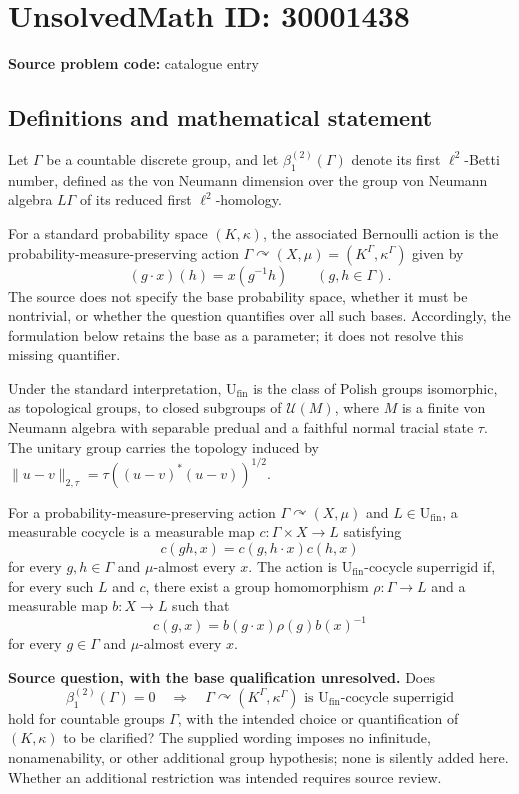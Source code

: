 \documentclass[11pt]{article}
\begin{document}
\section*{UnsolvedMath ID: 30001438}
\textbf{Source problem code:} catalogue entry
\subsection{Definitions and mathematical statement}
Let \(\Gamma\) be a countable discrete group, and let \(\beta^{(2)}_1(\Gamma)\) denote its first \(\ell^2\)-Betti number, defined as the von Neumann dimension over the group von Neumann algebra \(L\Gamma\) of its reduced first \(\ell^2\)-homology.

For a standard probability space \((K,\kappa)\), the associated Bernoulli action is the probability-measure-preserving action \(\Gamma\curvearrowright(X,\mu)=(K^\Gamma,\kappa^\Gamma)\) given by
\[
(g\cdot x)(h)=x(g^{-1}h)\qquad(g,h\in\Gamma).
\]
The source does not specify the base probability space, whether it must be nontrivial, or whether the question quantifies over all such bases. Accordingly, the formulation below retains the base as a parameter; it does not resolve this missing quantifier.

Under the standard interpretation, \(\mathrm{U}_{\mathrm{fin}}\) is the class of Polish groups isomorphic, as topological groups, to closed subgroups of \(\mathcal U(M)\), where \(M\) is a finite von Neumann algebra with separable predual and a faithful normal tracial state \(\tau\). The unitary group carries the topology induced by \(\|u-v\|_{2,\tau}=\tau((u-v)^*(u-v))^{1/2}\).

For a probability-measure-preserving action \(\Gamma\curvearrowright(X,\mu)\) and \(L\in\mathrm{U}_{\mathrm{fin}}\), a measurable cocycle is a measurable map \(c:\Gamma\times X\to L\) satisfying
\[
c(gh,x)=c(g,h\cdot x)c(h,x)
\]
for every \(g,h\in\Gamma\) and \(\mu\)-almost every \(x\). The action is \(\mathrm{U}_{\mathrm{fin}}\)-cocycle superrigid if, for every such \(L\) and \(c\), there exist a group homomorphism \(\rho:\Gamma\to L\) and a measurable map \(b:X\to L\) such that
\[
c(g,x)=b(g\cdot x)\rho(g)b(x)^{-1}
\]
for every \(g\in\Gamma\) and \(\mu\)-almost every \(x\).

\textbf{Source question, with the base qualification unresolved.} Does
\[
\beta^{(2)}_1(\Gamma)=0
\quad\Longrightarrow\quad
\Gamma\curvearrowright(K^\Gamma,\kappa^\Gamma)
\text{ is }\mathrm{U}_{\mathrm{fin}}\text{-cocycle superrigid}
\]
hold for countable groups \(\Gamma\), with the intended choice or quantification of \((K,\kappa)\) to be clarified? The supplied wording imposes no infinitude, nonamenability, or other additional group hypothesis; none is silently added here. Whether an additional restriction was intended requires source review.
\end{document}
